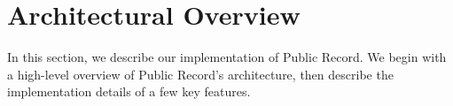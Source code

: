 \documentclass[letterpaper,11pt,twocolumn]{article}
\newcommand{\code}[1]{\texttt{\small #1}}
\newcommand{\hl}[1]{\colorbox{black!20}{#1}}
\begin{document}

%





\section{Architectural Overview} \label{sec:architecture}
\newcommand{\Client}{\texttt{Client}}
\newcommand{\Server}{\texttt{Server}}

In this section, we describe our implementation of Public Record.  We begin with a high-level overview of Public Record's architecture, then describe the implementation details of a few key features.
\end{document}
